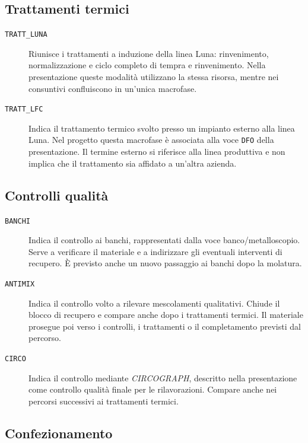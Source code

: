 \subsection{Trattamenti termici}

\begin{description}
\item[\texttt{TRATT\_LUNA}] Riunisce i trattamenti a induzione della linea Luna: rinvenimento, normalizzazione e ciclo completo di tempra e rinvenimento. Nella presentazione queste modalità utilizzano la stessa risorsa, mentre nei consuntivi confluiscono in un'unica macrofase.

\item[\texttt{TRATT\_LFC}] Indica il trattamento termico svolto presso un impianto esterno alla linea Luna. Nel progetto questa macrofase è associata alla voce \texttt{DFO} della presentazione. Il termine esterno si riferisce alla linea produttiva e non implica che il trattamento sia affidato a un'altra azienda.
\end{description}

\subsection{Controlli qualità}

\begin{description}
\item[\texttt{BANCHI}] Indica il controllo ai banchi, rappresentati dalla voce banco/metalloscopio. Serve a verificare il materiale e a indirizzare gli eventuali interventi di recupero. È previsto anche un nuovo passaggio ai banchi dopo la molatura.

\item[\texttt{ANTIMIX}] Indica il controllo volto a rilevare mescolamenti qualitativi. Chiude il blocco di recupero e compare anche dopo i trattamenti termici. Il materiale prosegue poi verso i controlli, i trattamenti o il completamento previsti dal percorso.

\item[\texttt{CIRCO}] Indica il controllo mediante \emph{CIRCOGRAPH}, descritto nella presentazione come controllo qualità finale per le rilavorazioni. Compare anche nei percorsi successivi ai trattamenti termici.
\end{description}

\subsection{Confezionamento}

